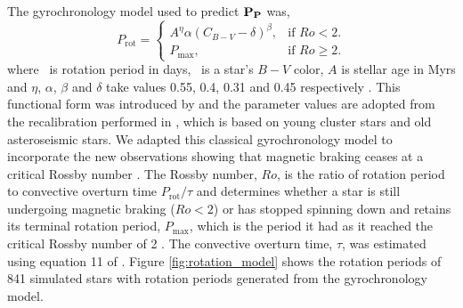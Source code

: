 The gyrochronology model used to predict $\bf{P_P}$ was,
\begin{equation}
    P_\mathrm{rot} =\begin{cases}
        A^\eta \alpha (C_{B-V} - \delta)^\beta, & \text{if $Ro < 2$}. \\
        P_{\mathrm{max}}, & \text{if $Ro \geq 2$}.
    \end{cases}
\label{eqn:gyro}
\end{equation}
where \prot\ is rotation period in days, \cbv\ is a star's $B-V$ color, $A$ is
stellar age in Myrs and $\eta$, $\alpha$, $\beta$ and $\delta$ take values
0.55, 0.4, 0.31 and 0.45 respectively \citep{angus2015}.
This functional form was introduced by \citep{barnes2007} and the parameter
values are adopted from the recalibration performed in \citet{angus2015},
which is based on young cluster stars and old asteroseismic stars.
We adapted this classical gyrochronology model to incorporate the new
observations showing that magnetic braking ceases at a critical Rossby number
\citep{vansaders2016}.
The Rossby number, $Ro$, is the ratio of rotation period to convective
overturn time $P_{\mathrm{rot}}/\tau$ and determines whether a star is still
undergoing magnetic braking ($Ro < 2$) or has stopped spinning down and
retains its terminal rotation period, $P_\mathrm{max}$, which is the period it
had as it reached the critical Rossby number of 2 \citep{vansaders2016}.
The convective overturn time, $\tau$, was estimated using equation 11 of
\citet{wright2011}.
Figure \ref{fig:rotation_model} shows the rotation periods of 841
simulated stars with rotation periods generated from the gyrochronology model.
